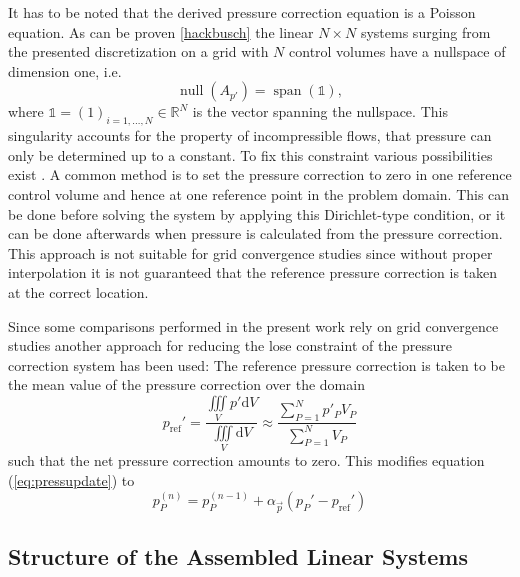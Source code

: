   It has to be noted that the derived pressure correction equation is a Poisson equation. As can be proven \ref{hackbusch} the linear \(N \times N\) systems surging from the presented discretization on a grid with \(N\) control volumes have a nullspace of dimension one, i.e.
  \begin{displaymath}
    \operatorname{null}(A_{p'}) = \operatorname{span}(\mathbb{1}),
  \end{displaymath}
  where \(\mathbb{1} = (1)_{i = 1,\dots,N} \in \mathbb{R}^N\) is the vector spanning the nullspace. This singularity accounts for the property of incompressible flows, that pressure can only be determined up to a constant. To fix this constraint various possibilities exist \cite{ferziger02}. A common method is to set the pressure correction to zero in one reference control volume and hence at one reference point in the problem domain. This can be done before solving the system by applying this Dirichlet-type condition, or it can be done afterwards when pressure is calculated from the pressure correction. This approach is not suitable for grid convergence studies since without proper interpolation it is not guaranteed that the reference pressure correction is taken at the correct location.

  Since some comparisons performed in the present work rely on grid convergence studies another approach for reducing the lose constraint of the pressure correction system has been used: The reference pressure correction is taken to be the mean value of the pressure correction over the domain 
  \begin{displaymath}
    p_{\text{ref}}' 
    = \frac{\iiint\limits_V p' \mathrm{d}V}{\iiint\limits_V \mathrm{d}V} 
      \approx \frac{\sum_{P = 1}^N p'_P V_P}{\sum_{P = 1}^N V_P}
  \end{displaymath}
  such that the net pressure correction amounts to zero. This modifies equation (\ref{eq:pressupdate}) to 
  \begin{equation}
    \label{eq:pressupdate2}
    p_P^{(n)} = p_P^{(n-1)} + \alpha_{\vec{p}} \left( p_P' - p_{\text{ref}}' \right)
  \end{equation}

  \subsection{Structure of the Assembled Linear Systems}
  \label{sec:structure}


